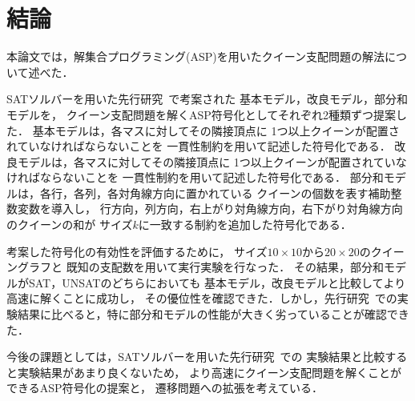 \chapter{結論}\label{chap:conclusion}

本論文では，解集合プログラミング(ASP)を用いたクイーン支配問題の解法について述べた．

SATソルバーを用いた先行研究~\cite{yamamoto21}で考案された
基本モデル，改良モデル，部分和モデルを，
クイーン支配問題を解くASP符号化としてそれぞれ2種類ずつ提案した．
基本モデルは，各マスに対してその隣接頂点に
1つ以上クイーンが配置されていなければならないことを
一貫性制約を用いて記述した符号化である．
改良モデルは，各マスに対してその隣接頂点に
1つ以上クイーンが配置されていなければならないことを
一貫性制約を用いて記述した符号化である．
部分和モデルは，各行，各列，各対角線方向に置かれている
クイーンの個数を表す補助整数変数を導入し，
行方向，列方向，右上がり対角線方向，右下がり対角線方向のクイーンの和が
サイズ$k$に一致する制約を追加した符号化である．

考案した符号化の有効性を評価するために，
サイズ$10 \times 10$から$20 \times 20$のクイーングラフと
既知の支配数を用いて実行実験を行なった．
その結果，部分和モデルがSAT，UNSATのどちらにおいても
基本モデル，改良モデルと比較してより高速に解くことに成功し，
その優位性を確認できた．しかし，先行研究~\cite{yamamoto21}での実験結果に比べると，特に部分和モデルの性能が大きく劣っていることが確認できた．

今後の課題としては，SATソルバーを用いた先行研究~\cite{yamamoto21}での
実験結果と比較すると実験結果があまり良くないため，
より高速にクイーン支配問題を解くことができるASP符号化の提案と，
遷移問題への拡張を考えている．


